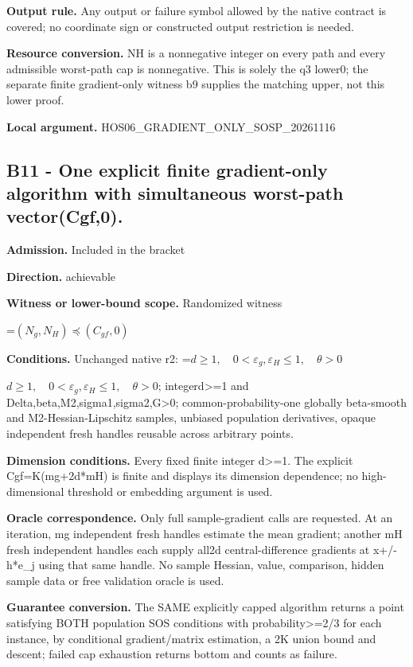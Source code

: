 \documentclass[10pt,a4paper]{article}
\newcommand{\AtlasMath}[1]{\par\begingroup\centering\setbox0=\hbox{$\displaystyle #1$}\ifdim\wd0>1.4\linewidth\typeout{ATLAS WIDE FORMULA: \the\wd0}\fi\ifdim\wd0>\linewidth\resizebox{\linewidth}{!}{\box0}\else\box0\fi\par\endgroup}
\newcommand{\AtlasInlineMath}[1]{\begingroup\setbox0=\hbox{$#1$}\ifdim\wd0>.4\linewidth\endgroup\AtlasMath{#1}\else\endgroup$#1$\fi}
\begin{document}
\textbf{Output rule.} Any output or failure symbol allowed by the native contract is covered; no coordinate sign or constructed output restriction is needed.

\textbf{Resource conversion.} NH is a nonnegative integer on every path and every admissible worst-path cap is nonnegative. This is solely the q3 lower0; the separate finite gradient-only witness b9 supplies the matching upper, not this lower proof.

\textbf{Local argument.} HOS06\_\allowbreak{}GRADIENT\_\allowbreak{}ONLY\_\allowbreak{}SOSP\_\allowbreak{}20261116

\subsection{B11 - One explicit finite gradient-only algorithm with simultaneous worst-path vector(Cgf,0).}
\textbf{Admission.} Included in the bracket

\textbf{Direction.} achievable

\textbf{Witness or lower-bound scope.} Randomized witness

\AtlasMath{(N_g,N_H)\preceq(C_{gf},0)}
\textbf{Conditions.} Unchanged native r2: \AtlasInlineMath{d\ge1,\quad0<\varepsilon_g,\varepsilon_H\le1,\quad\theta>0}; integerd>=1 and Delta,beta,M2,sigma1,sigma2,G>0; common-probability-one globally beta-smooth and M2-Hessian-Lipschitz samples, unbiased population derivatives, opaque independent fresh handles reusable across arbitrary points.

\textbf{Dimension conditions.} Every fixed finite integer d>=1. The explicit Cgf=K(mg+2d*mH) is finite and displays its dimension dependence; no high-dimensional threshold or embedding argument is used.

\textbf{Oracle correspondence.} Only full sample-gradient calls are requested. At an iteration, mg independent fresh handles estimate the mean gradient; another mH fresh independent handles each supply all2d central-difference gradients at x+/-h*e\_\allowbreak{}j using that same handle. No sample Hessian, value, comparison, hidden sample data or free validation oracle is used.

\textbf{Guarantee conversion.} The SAME explicitly capped algorithm returns a point satisfying BOTH population SOS conditions with probability>=2/3 for each instance, by conditional gradient/matrix estimation, a 2K union bound and descent; failed cap exhaustion returns bottom and counts as failure.
\end{document}
